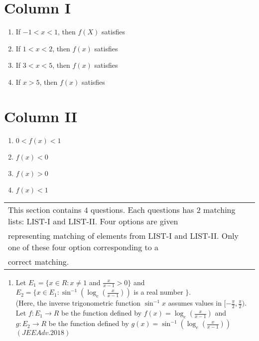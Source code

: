 \documentclass[journal,12pt,twocolumn]{IEEEtran}
\theoremstyle{remark}
\begin{document}
			              \begin{multicols}{2}
					      \section*{ Column I}
						\begin{enumerate}[label=(\Alph*)]
							\item If $-1<x<1$, then $f(X)$ satisfies
							\item If $1<x<2$, then $f(x)$ satisfies
							\item If $3<x<5$, then $f(x)$ satisfies
							\item If $x>5$, then $f(x)$ satisfies
						\end{enumerate}
						\columnbreak
						\section{ Column II}
						\begin{enumerate}[label=(\alph*) ,start=16]
							\item $0<f(x)<1$
							\item $f(x)<0$
							\item $f(x)>0$
							\item $f(x)<1$
						\end{enumerate}
					\end{multicols}
         \begin{tabular}{l|l}
\\
\hline
This section contains $4$ questions. Each questions has $2$ matching lists: LIST-I and LIST-II. Four options are given\\representing matching of elements from LIST-I and LIST-II. Only one of these four option corresponding to a\\correct matching.
\\
\hline
\end{tabular}
		 \begin{enumerate}[start=3]
	\item Let $E_1=\{x\in R:x\neq1$ and $\frac{x}{x-1}>0\}$ and $E_2=\{x\in E_1:\sin^{-1}(\log_e(\frac{x}{x-1}))$ is a real number $\}$.\\ 
		(Here, the inverse trigonometric function $\sin^{-1}x$ assumes values in $[-\frac{\pi}{2},\frac{\pi}{2})$.\\
		Let $f:E_1\to R$ be the function defined by $f(x)=\log_e(\frac{x}{x-1})$ and $g:E_2\to R$ be the function defined by $g(x)=\sin^{-1}(\log_e(\frac{x}{x-1}))$
		  \hfill${(JEE Adv.2018)}$
                 \end{enumerate}
\end{document}
